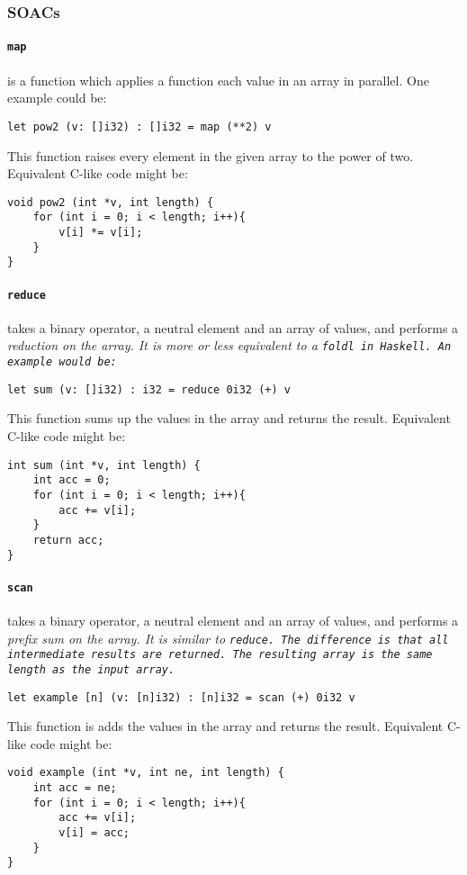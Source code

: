 \subsubsection{SOACs}
\paragraph{\tt{map}} is a function which applies a function each value in an
array in parallel. One example could be:

\begin{verbatim}
let pow2 (v: []i32) : []i32 = map (**2) v
\end{verbatim}

This function raises every element in the given array to the power of two.
Equivalent C-like code might be:

\begin{verbatim}
void pow2 (int *v, int length) {
	for (int i = 0; i < length; i++){
		v[i] *= v[i];
	}
}
\end{verbatim}

\paragraph{\tt{reduce}} takes a binary operator, a neutral element and an
array of values, and performs a \it{reduction} on the array. It is more or
less equivalent to a \tt{foldl} in \tt{Haskell}. An example would be:

\begin{verbatim}
let sum (v: []i32) : i32 = reduce 0i32 (+) v
\end{verbatim}

This function sums up the values in the array and returns the result.
Equivalent C-like code might be:

\begin{verbatim}
int sum (int *v, int length) {
	int acc = 0;
	for (int i = 0; i < length; i++){
		acc += v[i];
	}
	return acc;
}
\end{verbatim}


\paragraph{\tt{scan}} takes a binary operator, a neutral element and an
array of values, and performs a \it{prefix sum} on the array. It is similar
to \tt{reduce}. The difference is that all intermediate results are returned.
The resulting array is the same length as the input array.

\begin{verbatim}
let example [n] (v: [n]i32) : [n]i32 = scan (+) 0i32 v
\end{verbatim}

This function is adds the values in the array and returns the result.
Equivalent C-like code might be:

\begin{verbatim}
void example (int *v, int ne, int length) {
	int acc = ne;
	for (int i = 0; i < length; i++){
		acc += v[i];
		v[i] = acc;
	}
}
\end{verbatim}

